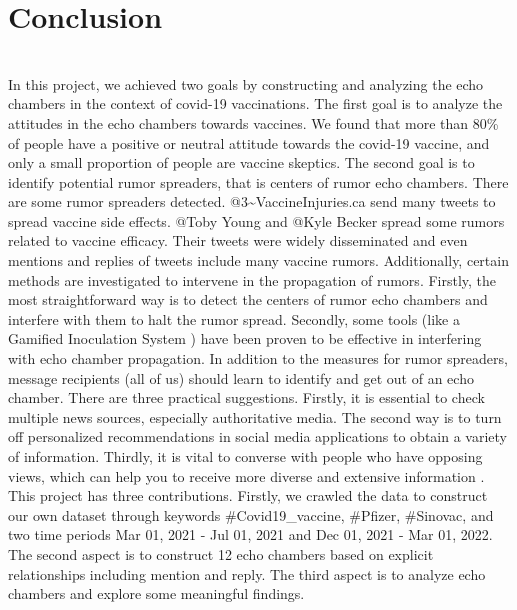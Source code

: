 \documentclass[sigplan,screen]{acmart}
\begin{document}
\section{Conclusion}
~\\
In this project, we achieved two goals by constructing and analyzing the echo chambers in the context of covid-19 vaccinations. 
The first goal is to analyze the attitudes in the echo chambers towards vaccines. We found that more than 80\% of people have a positive or neutral attitude towards the covid-19 vaccine, and only a small proportion of people are vaccine skeptics. The second goal is to identify potential rumor spreaders, that is centers of rumor echo chambers. There are some rumor spreaders detected. @3\textasciitilde VaccineInjuries.ca send many tweets to spread vaccine side effects. @Toby Young and @Kyle Becker spread some rumors related to vaccine efficacy. Their tweets were widely disseminated and even mentions and replies of tweets include many vaccine rumors. Additionally, certain methods are investigated to intervene in the propagation of rumors. Firstly, the most straightforward way is to detect the centers of rumor echo chambers and interfere with them to halt the rumor spread. Secondly, some tools (like a Gamified Inoculation System {\cite{chamberbreaker}} ) have been proven to be effective in interfering with echo chamber propagation. In addition to the measures for rumor spreaders, message recipients (all of us) should learn to identify and get out of an echo chamber. There are three practical suggestions. Firstly, it is essential to check multiple news sources, especially authoritative media. The second way is to turn off personalized recommendations in social media applications to obtain a variety of information. Thirdly, it is vital to converse with people who have opposing views, which can help you to receive more diverse and extensive information {\cite{getoutofec}}.
~\\
This project has three contributions. Firstly, we crawled the data to construct our own dataset through keywords \#Covid19\_vaccine, \#Pfizer, \#Sinovac, and two time periods Mar 01, 2021 - Jul 01, 2021 and Dec 01, 2021 - Mar 01, 2022. The second aspect is to construct 12 echo chambers based on explicit relationships including mention and reply. The third aspect is to analyze echo chambers and explore some meaningful findings. 



\end{document}
